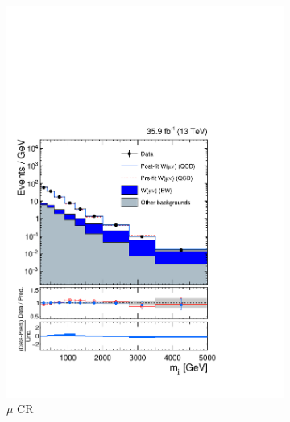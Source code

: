 \begin{figure}[]
\begin{center}
\begin{subfigure}[t]{0.32\textwidth}
            \includegraphics[width=\textwidth]{figures/vbf/fits/vbf_PULLS_prefit_postfit_singlemuon.pdf}
            \caption{$\mu$ CR}
        \end{subfigure}
        \begin{subfigure}[t]{0.32\textwidth}

\end{subfigure}
\end{center}
\end{figure}
